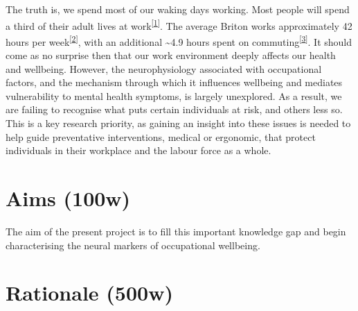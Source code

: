 \documentclass[]{article}
\begin{document}
The truth is, we spend most of our waking days working. Most people will spend a third of their adult lives at work\textsuperscript{{[}\protect\hyperlink{ref-WHO1995}{1}{]}}. The average Briton works approximately 42 hours per week\textsuperscript{{[}\protect\hyperlink{ref-TUC1}{2}{]}}, with an additional \textasciitilde{}4.9 hours spent on commuting\textsuperscript{{[}\protect\hyperlink{ref-TUC2}{3}{]}}. It should come as no surprise then that our work environment deeply affects our health and wellbeing. However, the neurophysiology associated with occupational factors, and the mechanism through which it influences wellbeing and mediates vulnerability to mental health symptoms, is largely unexplored. As a result, we are failing to recognise what puts certain individuals at risk, and others less so. This is a key research priority, as gaining an insight into these issues is needed to help guide preventative interventions, medical or ergonomic, that protect individuals in their workplace and the labour force as a whole.

\hypertarget{aims-100w}{%
\section{Aims (100w)}\label{aims-100w}}

The aim of the present project is to fill this important knowledge gap and begin characterising the neural markers of occupational wellbeing.

\hypertarget{rationale-500w}{%
\section{Rationale (500w)}\label{rationale-500w}}
\end{document}
